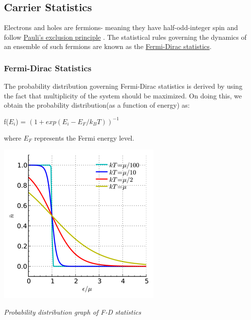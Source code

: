 \documentclass[12 pt]{article}
\begin{document}
\subsection{Carrier Statistics}

Electrons and holes are fermions- meaning they have half-odd-integer spin and follow \href{https://en.wikipedia.org/wiki/Pauli_exclusion_principle}{Pauli's exclusion principle} . The statistical rules governing the dynamics of an ensemble of such fermions are known as the \href{https://en.wikipedia.org/wiki/Fermi%E2%80%93Dirac_statistics#:~:text=Fermi%2DDirac%20statistics%20is%20a,of%20particles%20over%20energy%20states.}{Fermi-Dirac statistics}.

\subsubsection{Fermi-Dirac Statistics}
The probability distribution governing Fermi-Dirac statistics is derived by using the fact that multiplicity of the system should be maximized. On doing this, we obtain the probability distribution(as a function of energy) as:
\begin{center}
    f($E_{i}$) = $(1+exp(E_{i}-E_{F}/k_{B}T))^{-1}$
\end{center}
where $E_{F}$ represents the Fermi energy level. 

  \par
  \begin{center}
   \includegraphics{1027px-FD_e_mu.svg_2_30.png}
   \end{center}
    \begin{center}
      \emph{Probability distribution graph of F-D statistics}
  \end{center}
\par
\end{document}
